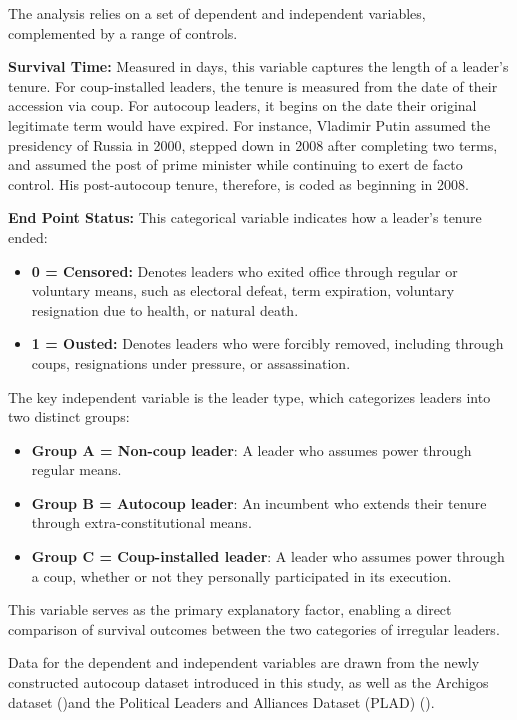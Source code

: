 \documentclass[
  12pt,
]{report}
\providecommand{\tightlist}{%
  \setlength{\itemsep}{0pt}\setlength{\parskip}{0pt}}
\begin{document}
The analysis relies on a set of dependent and independent variables,
complemented by a range of controls.

\textbf{Survival Time:} Measured in days, this variable captures the
length of a leader's tenure. For coup-installed leaders, the tenure is
measured from the date of their accession via coup. For autocoup
leaders, it begins on the date their original legitimate term would have
expired. For instance, Vladimir Putin assumed the presidency of Russia
in 2000, stepped down in 2008 after completing two terms, and assumed
the post of prime minister while continuing to exert de facto control.
His post-autocoup tenure, therefore, is coded as beginning in 2008.

\textbf{End Point Status:} This categorical variable indicates how a
leader's tenure ended:

\begin{itemize}
\item
  \textbf{0 = Censored:} Denotes leaders who exited office through
  regular or voluntary means, such as electoral defeat, term expiration,
  voluntary resignation due to health, or natural death.
\item
  \textbf{1 = Ousted:} Denotes leaders who were forcibly removed,
  including through coups, resignations under pressure, or
  assassination.
\end{itemize}

The key independent variable is the leader type, which categorizes
leaders into two distinct groups:

\begin{itemize}
\tightlist
\item
  \textbf{Group A = Non-coup leader}: A leader who assumes power through
  regular means.
\item
  \textbf{Group B = Autocoup leader}: An incumbent who extends their
  tenure through extra-constitutional means.
\item
  \textbf{Group C = Coup-installed leader}: A leader who assumes power
  through a coup, whether or not they personally participated in its
  execution.
\end{itemize}

This variable serves as the primary explanatory factor, enabling a
direct comparison of survival outcomes between the two categories of
irregular leaders.

Data for the dependent and independent variables are drawn from the
newly constructed autocoup dataset introduced in this study, as well as
the Archigos dataset ()and the Political Leaders and Alliances Dataset (PLAD)
().
\end{document}
